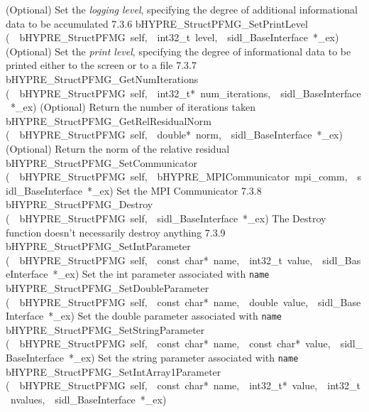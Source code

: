 \documentclass{article}
\begin{document}
\begin{cxxentry}
\begin{cxxentry}
\begin{cxxnames}
        {
(Optional) Set the {\it logging level}, specifying the degree
of additional informational data to be accumulated}
        {7.3.6}
        {bHYPRE\_StructPFMG\_SetPrintLevel}
        {(\ \ bHYPRE\_StructPFMG\ self,\ \ int32\_t\ level,\ \ sidl\_BaseInterface\ *\_ex)}
        {
(Optional) Set the {\it print level}, specifying the degree
of informational data to be printed either to the screen or
to a file}
        {7.3.7}
        {bHYPRE\_StructPFMG\_GetNumIterations}
        {(\ \ bHYPRE\_StructPFMG\ self,\ \ int32\_t*\ num\_iterations,\ \ sidl\_BaseInterface\ *\_ex)}
        {
(Optional) Return the number of iterations taken}
        {}
\label{cxx.7.3.15}
        {bHYPRE\_StructPFMG\_GetRelResidualNorm}
        {(\ \ bHYPRE\_StructPFMG\ self,\ \ double*\ norm,\ \ sidl\_BaseInterface\ *\_ex)}
        {
(Optional) Return the norm of the relative residual}
        {}
\label{cxx.7.3.16}
        {bHYPRE\_StructPFMG\_SetCommunicator}
        {(\ \ bHYPRE\_StructPFMG\ self,\ \ bHYPRE\_MPICommunicator\ mpi\_comm,\ \ sidl\_BaseInterface\ *\_ex)}
        {
Set the MPI Communicator}
        {7.3.8}
        {bHYPRE\_StructPFMG\_Destroy}
        {(\ \ bHYPRE\_StructPFMG\ self,\ \ sidl\_BaseInterface\ *\_ex)}
        {
The Destroy function doesn't necessarily destroy anything}
        {7.3.9}
        {bHYPRE\_StructPFMG\_SetIntParameter}
        {(\ \ bHYPRE\_StructPFMG\ self,\ \ const\ char*\ name,\ \ int32\_t\ value,\ \ sidl\_BaseInterface\ *\_ex)}
        {
Set the int parameter associated with {\tt name}}
        {}
\label{cxx.7.3.17}
        {bHYPRE\_StructPFMG\_SetDoubleParameter}
        {(\ \ bHYPRE\_StructPFMG\ self,\ \ const\ char*\ name,\ \ double\ value,\ \ sidl\_BaseInterface\ *\_ex)}
        {
Set the double parameter associated with {\tt name}}
        {}
\label{cxx.7.3.18}
        {bHYPRE\_StructPFMG\_SetStringParameter}
        {(\ \ bHYPRE\_StructPFMG\ self,\ \ const\ char*\ name,\ \ const\ char*\ value,\ \ sidl\_BaseInterface\ *\_ex)}
        {
Set the string parameter associated with {\tt name}}
        {}
\label{cxx.7.3.19}
        {bHYPRE\_StructPFMG\_SetIntArray1Parameter}
        {(\ \ bHYPRE\_StructPFMG\ self,\ \ const\ char*\ name,\ \ int32\_t*\ value,\ \ int32\_t\ nvalues,\ \ sidl\_BaseInterface\ *\_ex)}

\end{cxxnames}
\end{cxxentry}
\end{cxxentry}
\end{document}
